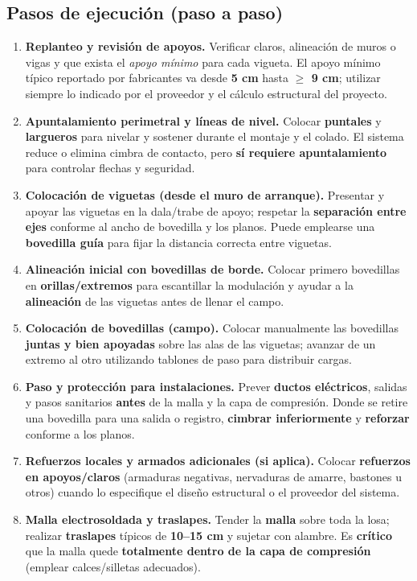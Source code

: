 \documentclass[12pt]{article}
\begin{document}
	\subsection*{Pasos de ejecución (paso a paso)}
	\begin{enumerate}
		\item \textbf{Replanteo y revisión de apoyos.} Verificar claros, alineación de muros o vigas y que exista el \emph{apoyo mínimo} para cada vigueta. El apoyo mínimo típico reportado por fabricantes va desde \textbf{5 cm} hasta \textbf{$\geq$ 9 cm}; utilizar siempre lo indicado por el proveedor y el cálculo estructural del proyecto.
		\item \textbf{Apuntalamiento perimetral y líneas de nivel.} Colocar \textbf{puntales} y \textbf{largueros} para nivelar y sostener durante el montaje y el colado. El sistema reduce o elimina cimbra de contacto, pero \textbf{sí requiere apuntalamiento} para controlar flechas y seguridad.
		\item \textbf{Colocación de viguetas (desde el muro de arranque).} Presentar y apoyar las viguetas en la dala/trabe de apoyo; respetar la \textbf{separación entre ejes} conforme al ancho de bovedilla y los planos. Puede emplearse una \textbf{bovedilla guía} para fijar la distancia correcta entre viguetas.
		\item \textbf{Alineación inicial con bovedillas de borde.} Colocar primero bovedillas en \textbf{orillas/extremos} para escantillar la modulación y ayudar a la \textbf{alineación} de las viguetas antes de llenar el campo.
		\item \textbf{Colocación de bovedillas (campo).} Colocar manualmente las bovedillas \textbf{juntas y bien apoyadas} sobre las alas de las viguetas; avanzar de un extremo al otro utilizando tablones de paso para distribuir cargas.
		\item \textbf{Paso y protección para instalaciones.} Prever \textbf{ductos eléctricos}, salidas y pasos sanitarios \textbf{antes} de la malla y la capa de compresión. Donde se retire una bovedilla para una salida o registro, \textbf{cimbrar inferiormente} y \textbf{reforzar} conforme a los planos.
		\item \textbf{Refuerzos locales y armados adicionales (si aplica).} Colocar \textbf{refuerzos en apoyos/claros} (armaduras negativas, nervaduras de amarre, bastones u otros) cuando lo especifique el diseño estructural o el proveedor del sistema.
		\item \textbf{Malla electrosoldada y traslapes.} Tender la \textbf{malla} sobre toda la losa; realizar \textbf{traslapes} típicos de \textbf{10--15 cm} y sujetar con alambre. Es \textbf{crítico} que la malla quede \textbf{totalmente dentro de la capa de compresión} (emplear calces/silletas adecuados).

\end{enumerate}
\end{document}
